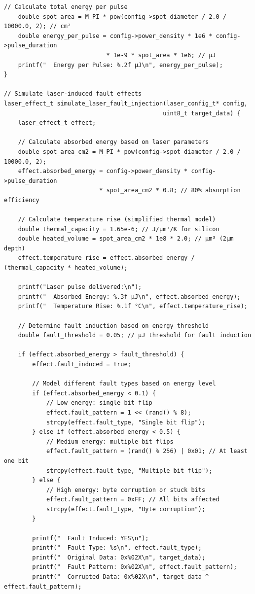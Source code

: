 \documentclass[12pt,a4paper]{article}
\begin{document}
\begin{lstlisting}[caption={Laser Fault Injection Control System}]
    // Calculate total energy per pulse
    double spot_area = M_PI * pow(config->spot_diameter / 2.0 / 10000.0, 2); // cm²
    double energy_per_pulse = config->power_density * 1e6 * config->pulse_duration 
                             * 1e-9 * spot_area * 1e6; // μJ
    printf("  Energy per Pulse: %.2f μJ\n", energy_per_pulse);
}

// Simulate laser-induced fault effects
laser_effect_t simulate_laser_fault_injection(laser_config_t* config, 
                                             uint8_t target_data) {
    laser_effect_t effect;
    
    // Calculate absorbed energy based on laser parameters
    double spot_area_cm2 = M_PI * pow(config->spot_diameter / 2.0 / 10000.0, 2);
    effect.absorbed_energy = config->power_density * config->pulse_duration 
                           * spot_area_cm2 * 0.8; // 80% absorption efficiency
    
    // Calculate temperature rise (simplified thermal model)
    double thermal_capacity = 1.65e-6; // J/μm³/K for silicon
    double heated_volume = spot_area_cm2 * 1e8 * 2.0; // μm³ (2μm depth)
    effect.temperature_rise = effect.absorbed_energy / (thermal_capacity * heated_volume);
    
    printf("Laser pulse delivered:\n");
    printf("  Absorbed Energy: %.3f μJ\n", effect.absorbed_energy);
    printf("  Temperature Rise: %.1f °C\n", effect.temperature_rise);
    
    // Determine fault induction based on energy threshold
    double fault_threshold = 0.05; // μJ threshold for fault induction
    
    if (effect.absorbed_energy > fault_threshold) {
        effect.fault_induced = true;
        
        // Model different fault types based on energy level
        if (effect.absorbed_energy < 0.1) {
            // Low energy: single bit flip
            effect.fault_pattern = 1 << (rand() % 8);
            strcpy(effect.fault_type, "Single bit flip");
        } else if (effect.absorbed_energy < 0.5) {
            // Medium energy: multiple bit flips
            effect.fault_pattern = (rand() % 256) | 0x01; // At least one bit
            strcpy(effect.fault_type, "Multiple bit flip");
        } else {
            // High energy: byte corruption or stuck bits
            effect.fault_pattern = 0xFF; // All bits affected
            strcpy(effect.fault_type, "Byte corruption");
        }
        
        printf("  Fault Induced: YES\n");
        printf("  Fault Type: %s\n", effect.fault_type);
        printf("  Original Data: 0x%02X\n", target_data);
        printf("  Fault Pattern: 0x%02X\n", effect.fault_pattern);
        printf("  Corrupted Data: 0x%02X\n", target_data ^ effect.fault_pattern);
        

\end{lstlisting}
\end{document}
